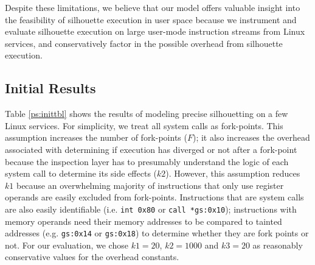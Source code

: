 Despite these limitations, we believe
that our model offers valuable insight
into the feasibility of silhouette execution
in user space because we instrument and evaluate
silhouette execution on large user-mode
instruction streams from Linux services,
and conservatively factor in the possible overhead
from silhouette execution.

\subsection{Initial Results}
 \newline
Table \ref{ps:inittbl} shows the results of modeling 
precise silhouetting on a few Linux services.
For simplicity, we treat
all system calls as fork-points.
This assumption increases the number of fork-points ($F$);
it also increases the overhead associated with determining 
if execution has diverged or not after a fork-point
because the inspection layer has to presumably
understand the logic of each system call
to determine its side effects ($k2$). However,
this assumption reduces $k1$ because an overwhelming majority
of instructions that only use register operands are easily
excluded from fork-points. Instructions
that are system calls are also easily identifiable (i.e. \texttt{int 0x80} or \texttt{call *gs:0x10});
instructions with memory operands need
their memory addresses to be 
compared to tainted addresses (e.g. \texttt{gs:0x14} or \texttt{gs:0x18})
to determine whether they are fork points or not.
For our evaluation, we chose $k1 = 20$,
$k2 = 1000$ and $k3 = 20$ as reasonably
conservative values for the overhead constants.

